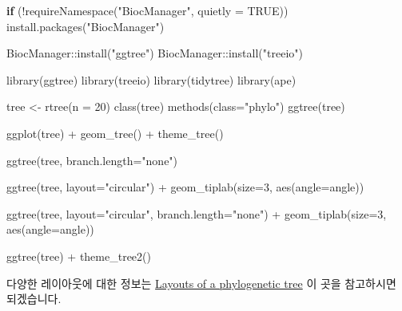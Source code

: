 \documentclass[
]{book}
\newenvironment{Shaded}{\begin{snugshade}}{\end{snugshade}}
\newcommand{\AttributeTok}[1]{\textcolor[rgb]{0.77,0.63,0.00}{#1}}
\newcommand{\ConstantTok}[1]{\textcolor[rgb]{0.00,0.00,0.00}{#1}}
\newcommand{\ControlFlowTok}[1]{\textcolor[rgb]{0.13,0.29,0.53}{\textbf{#1}}}
\newcommand{\DecValTok}[1]{\textcolor[rgb]{0.00,0.00,0.81}{#1}}
\newcommand{\FunctionTok}[1]{\textcolor[rgb]{0.00,0.00,0.00}{#1}}
\newcommand{\NormalTok}[1]{#1}
\newcommand{\OtherTok}[1]{\textcolor[rgb]{0.56,0.35,0.01}{#1}}
\newcommand{\SpecialCharTok}[1]{\textcolor[rgb]{0.00,0.00,0.00}{#1}}
\newcommand{\StringTok}[1]{\textcolor[rgb]{0.31,0.60,0.02}{#1}}
\begin{document}
\begin{Shaded}
\begin{Highlighting}[]
\ControlFlowTok{if}\NormalTok{ (}\SpecialCharTok{!}\FunctionTok{requireNamespace}\NormalTok{(}\StringTok{"BiocManager"}\NormalTok{, }\AttributeTok{quietly =} \ConstantTok{TRUE}\NormalTok{))}
    \FunctionTok{install.packages}\NormalTok{(}\StringTok{"BiocManager"}\NormalTok{)}

\NormalTok{BiocManager}\SpecialCharTok{::}\FunctionTok{install}\NormalTok{(}\StringTok{"ggtree"}\NormalTok{)}
\NormalTok{BiocManager}\SpecialCharTok{::}\FunctionTok{install}\NormalTok{(}\StringTok{"treeio"}\NormalTok{)}

\FunctionTok{library}\NormalTok{(ggtree)}
\FunctionTok{library}\NormalTok{(treeio)}
\FunctionTok{library}\NormalTok{(tidytree)}
\FunctionTok{library}\NormalTok{(ape)}

\NormalTok{tree }\OtherTok{\textless{}{-}} \FunctionTok{rtree}\NormalTok{(}\AttributeTok{n =} \DecValTok{20}\NormalTok{)}
\FunctionTok{class}\NormalTok{(tree)           }
\FunctionTok{methods}\NormalTok{(}\AttributeTok{class=}\StringTok{"phylo"}\NormalTok{)}
\FunctionTok{ggtree}\NormalTok{(tree)}

\FunctionTok{ggplot}\NormalTok{(tree) }\SpecialCharTok{+}
  \FunctionTok{geom\_tree}\NormalTok{() }\SpecialCharTok{+}
  \FunctionTok{theme\_tree}\NormalTok{()}

\FunctionTok{ggtree}\NormalTok{(tree, }\AttributeTok{branch.length=}\StringTok{"none"}\NormalTok{)}

\FunctionTok{ggtree}\NormalTok{(tree, }\AttributeTok{layout=}\StringTok{"circular"}\NormalTok{) }\SpecialCharTok{+}
  \FunctionTok{geom\_tiplab}\NormalTok{(}\AttributeTok{size=}\DecValTok{3}\NormalTok{, }\FunctionTok{aes}\NormalTok{(}\AttributeTok{angle=}\NormalTok{angle))}

\FunctionTok{ggtree}\NormalTok{(tree, }\AttributeTok{layout=}\StringTok{"circular"}\NormalTok{, }\AttributeTok{branch.length=}\StringTok{"none"}\NormalTok{) }\SpecialCharTok{+}
  \FunctionTok{geom\_tiplab}\NormalTok{(}\AttributeTok{size=}\DecValTok{3}\NormalTok{, }\FunctionTok{aes}\NormalTok{(}\AttributeTok{angle=}\NormalTok{angle))}

\FunctionTok{ggtree}\NormalTok{(tree) }\SpecialCharTok{+}
  \FunctionTok{theme\_tree2}\NormalTok{()}
\end{Highlighting}
\end{Shaded}

다양한 레이아웃에 대한 정보는 \href{https://yulab-smu.top/treedata-book/chapter4.html\#tree-layouts}{Layouts of a phylogenetic tree} 이 곳을 참고하시면 되겠습니다.
\end{document}
